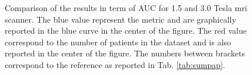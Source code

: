 \begin{figure}
{
}
\hspace*{\fill}
\caption{Comparison of the results in term of AUC for 1.5 and 3.0 Tesla \ac{mri} scanner. The blue value represent the metric and are graphically reported in the blue curve in the center of the figure. The red value correspond to the number of patients in the dataset and is also reported in the center of the figure. The numbers between brackets correspond to the reference as reported in Tab. \ref{tab:sumpap}.}
\label{fig:auc}
\end{figure}


